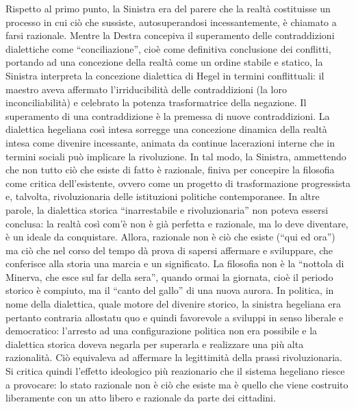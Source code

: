\documentclass[a4paper,12pt,oneside,openany]{book}%
\begin{document}
Rispetto al primo punto, la Sinistra era del parere che la realtà costituisse un processo in cui ciò che sussiste, autosuperandosi incessantemente, è chiamato a farsi razionale. Mentre la Destra concepiva il superamento delle contraddizioni dialettiche come “conciliazione”, cioè come definitiva conclusione dei conflitti, portando ad una concezione della realtà come un ordine stabile e statico, la Sinistra interpreta la concezione dialettica di Hegel in termini conflittuali: il maestro aveva affermato l’irriducibilità delle contraddizioni (la loro inconciliabilità) e celebrato la potenza trasformatrice della negazione. Il superamento di una contraddizione è la premessa di nuove contraddizioni. La dialettica hegeliana così intesa sorregge una concezione dinamica della realtà intesa come divenire incessante, animata da continue lacerazioni interne che in termini sociali può implicare la rivoluzione.  In tal modo, la Sinistra, ammettendo che non tutto ciò che esiste di fatto è razionale, finiva per concepire la filosofia come critica dell’esistente, ovvero come un progetto di trasformazione progressista e, talvolta, rivoluzionaria delle istituzioni politiche contemporanee. In altre parole, la dialettica storica “inarrestabile e rivoluzionaria” non poteva essersi conclusa: la realtà così com’è non è già perfetta e razionale, ma lo deve diventare, è un ideale da conquistare. Allora, razionale non è ciò che esiste (“qui ed ora”) ma ciò che nel corso del tempo dà prova di sapersi affermare e sviluppare, che conferisce alla storia una marcia e un significato. La filosofia non è la “nottola di Minerva, che esce sul far della sera”, quando ormai la giornata, cioè il periodo storico è compiuto, ma il “canto del gallo” di una nuova aurora. In politica, in nome della dialettica, quale motore del divenire storico, la sinistra hegeliana era pertanto contraria allostatu quo e quindi favorevole a sviluppi in senso liberale e democratico: l’arresto ad una configurazione politica non era possibile e la dialettica storica doveva negarla per superarla e realizzare una più alta razionalità. Ciò equivaleva ad affermare la legittimità della prassi rivoluzionaria. Si critica quindi l’effetto ideologico più reazionario che il sistema hegeliano riesce a provocare: lo stato razionale non è ciò che esiste ma è quello che viene costruito liberamente con un atto libero e razionale da parte dei cittadini.
\end{document}
